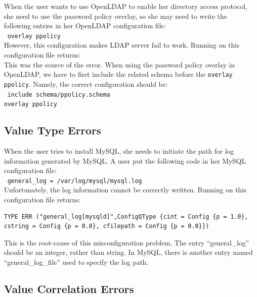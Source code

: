 When the user wants to use OpenLDAP to enable her directory access
protocol, she need to use the password policy overlay, so she may need
to write the following entries in her OpenLDAP configuration file:\\
\texttt{
 \hspace*{3em}overlay ppolicy\\}
However, this configuration makes LDAP server fail to work.
Running \app on this configuration file returns:
\\
This was the source of the error. When using the password policy overlay
in OpenLDAP, we have to first include the related schema before the
{\tt overlay ppolicy}. Namely, the correct configuration should be:\\
\texttt{
 \hspace*{3em}include schema/ppolicy.schema\\
 \hspace*{3em}overlay ppolicy\\
}

\subsection{Value Type Errors}

When the user tries to install MySQL, she needs to initiate the path for
log information generated by MySQL. A user put the following code in 
her MySQL configuration file:\\
\texttt{
 \hspace*{3em}general\_log = /var/log/mysql/mysql.log\\}
Unfortunately, the log information cannot be correctly written.
Running \app on this configuration file returns:
\begin{verbatim}
TYPE ERR ("general_log[mysqld]",ConfigQType {cint = Config {p = 1.0}, cstring = Config {p = 0.0}, cfilepath = Config {p = 0.0}})
\end{verbatim}
This is the root-cause of this misconfiguration problem. 
The entry ``general\_log'' should be an integer, 
rather than string. In MySQL, there is another entry named
``general\_log\_file'' used to specify the log path.  

\subsection{Value Correlation Errors}


